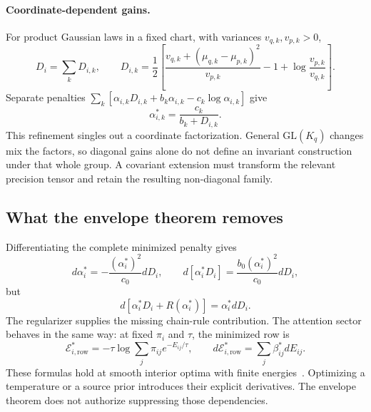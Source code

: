 \paragraph{Coordinate-dependent gains.}\label{par:per_coord_alpha}
For product Gaussian laws in a fixed chart, with variances $v_{q,k},v_{p,k}>0$,
\begin{equation}
D_i=\sum_kD_{i,k},\qquad
D_{i,k}=\frac12\left[
\frac{v_{q,k}+(\mu_{q,k}-\mu_{p,k})^2}{v_{p,k}}
-1+\log\frac{v_{p,k}}{v_{q,k}}\right].
\label{eq:kl_decomposition_per_coord}
\end{equation}
Separate penalties $\sum_k[\alpha_{i,k}D_{i,k}+b_k\alpha_{i,k}-c_k\log\alpha_{i,k}]$ give
\begin{equation}
\alpha_{i,k}^*=\frac{c_k}{b_k+D_{i,k}}.
\label{eq:adaptive_self_coupling_per_coord}
\end{equation}
This refinement singles out a coordinate factorization. General $\mathrm{GL}(K_q)$ changes mix the factors, so diagonal gains alone do not define an invariant construction under that whole group. A covariant extension must transform the relevant precision tensor and retain the resulting non-diagonal family.

\subsection{What the envelope theorem removes}\label{sec:envelope_theorem}
Differentiating the complete minimized penalty gives
\begin{equation}
d\alpha_i^*=-\frac{(\alpha_i^*)^2}{c_0}dD_i,\qquad
d[\alpha_i^*D_i]=\frac{b_0(\alpha_i^*)^2}{c_0}dD_i,
\label{eq:alpha_chain_rule_itfb}
\end{equation}
but
\begin{equation}
d[\alpha_i^*D_i+R(\alpha_i^*)]=\alpha_i^*dD_i.
\label{eq:alpha_envelope_cancel_itfb}
\end{equation}
The regularizer supplies the missing chain-rule contribution. The attention sector behaves in the same way: at fixed $\pi_i$ and $\tau$, the minimized row is
\begin{equation}
\mathcal E_{i,\mathrm{row}}^*
=-\tau\log\sum_j\pi_{ij}e^{-E_{ij}/\tau},
\qquad
d\mathcal E_{i,\mathrm{row}}^*=\sum_j\beta_{ij}^*dE_{ij}.
\label{eq:free_energy_reduced}
\end{equation}
These formulas hold at smooth interior optima with finite energies~\cite{MilgromSegal2002}. Optimizing a temperature or a source prior introduces their explicit derivatives. The envelope theorem does not authorize suppressing those dependencies.

